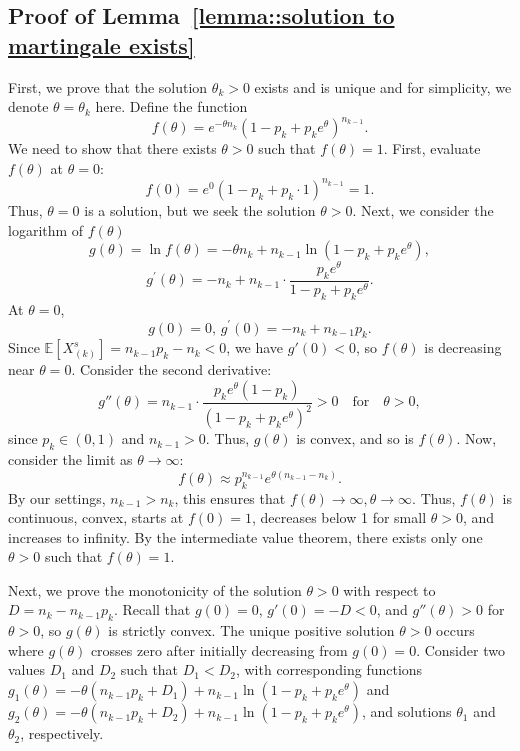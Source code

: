\subsection{Proof of Lemma~\ref{lemma::solution to martingale exists}}\label{appendix_lemma::proof of solution to martingale exists}
First, we prove that the solution $\theta_k>0$ exists and is unique and for simplicity, we denote $\theta=\theta_k$ here. Define the function
\[
f(\theta) = e^{-\theta n_{k}} (1 - p_k + p_k e^{\theta})^{n_{k-1}}.
\]
We need to show that there exists \(\theta > 0\) such that \(f(\theta) = 1\). First, evaluate \(f(\theta)\) at \(\theta = 0\):
\[
f(0) = e^{0} (1 - p_k + p_k \cdot 1)^{n_{k-1}} = 1.
\]
Thus, \(\theta = 0\) is a solution, but we seek the solution \(\theta > 0\). Next, we consider the logarithm of $f(\theta)$
$$g(\theta) = \ln f(\theta) = -\theta n_{k} + n_{k-1} \ln(1 - p_k + p_k e^{\theta}),$$
$$ g^\prime(\theta) = -n_{k} + n_{k-1} \cdot \frac{p_k e^{\theta}}{1 - p_k + p_k e^{\theta}}.$$
At \(\theta = 0\),
\[
g(0)=0,\,g^\prime(0) = -n_{k} + n_{k-1} p_k.
\]
Since \(\mathbb{E}[X^s_{(k)}] = n_{k-1} p_k - n_{k} < 0\), we have \(g'(0) < 0\), so \(f(\theta)\) is decreasing near \(\theta = 0\). Consider the second derivative:
\[
g''(\theta) = n_{k-1} \cdot \frac{p_k e^{\theta} (1 - p_k)}{(1 - p_k + p_k e^{\theta})^2} > 0 \quad \text{for} \quad \theta > 0,
\]
since \(p_k \in (0, 1)\) and \(n_{k-1} > 0\). Thus, \(g(\theta)\) is convex, and so is \(f(\theta)\). Now, consider the limit as \(\theta \to \infty\):
\[
f(\theta) \approx p_k^{n_{k-1}} e^{\theta (n_{k-1} - n_{k})}.
\]
By our settings, $n_{k-1}>n_k$, this ensures that $f(\theta)\to \infty, \theta\to \infty$. Thus, \(f(\theta)\) is continuous, convex, starts at \(f(0) = 1\), decreases below 1 for small \(\theta > 0\), and increases to infinity. By the intermediate value theorem, there exists only one \(\theta > 0\) such that \(f(\theta) = 1\). 

Next, we prove the monotonicity of the solution $\theta>0$ with respect to \(D = n_k - n_{k-1} p_k\). Recall that \(g(0) = 0\), \(g'(0) = -D < 0\), and \(g''(\theta) > 0\) for \(\theta > 0\), so \(g(\theta)\) is strictly convex. The unique positive solution \(\theta > 0\) occurs where \(g(\theta)\) crosses zero after initially decreasing from \(g(0) = 0\). Consider two values \(D_1\) and \(D_2\) such that \(D_1 < D_2\), with corresponding functions \(g_1(\theta) = -\theta (n_{k-1} p_k + D_1) + n_{k-1} \ln(1 - p_k + p_k e^{\theta})\) and \(g_2(\theta) = -\theta (n_{k-1} p_k + D_2) + n_{k-1} \ln(1 - p_k + p_k e^{\theta})\), and solutions \(\theta_1\) and \(\theta_2\), respectively. 

